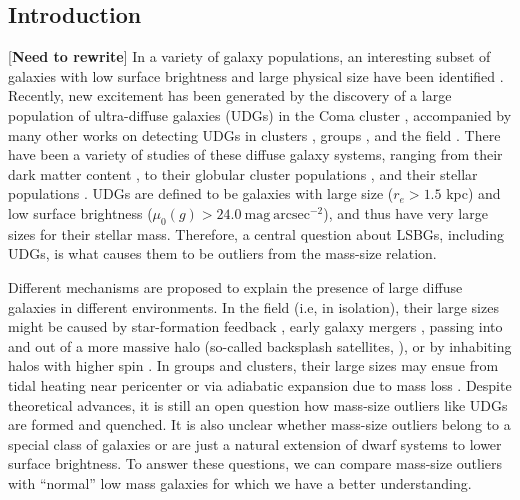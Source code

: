 \documentclass[twocolumn,astrosymb,twocolappendix]{aastex631}
\newcommand{\sbunit}{\mathrm{mag\ arcsec}^{-2}}
\newcommand{\sbcen}{\mu_{0}(g)}
\begin{document}
\begin{CJK*}{UTF8}{gbsn}


\section{Introduction} \label{sec:intro}
[\textbf{Need to rewrite}] In a variety of galaxy populations, an interesting subset of galaxies with low surface brightness and large physical size have been identified \citep[dubbed low surface brightness galaxies or LSBGs, e.g.,][]{Sandage1984,Caldwell1987,Impey1988,McGaugh1995,Dalcanton1997a}. Recently, new excitement has been generated by the discovery of a large population of ultra-diffuse galaxies (UDGs) in the Coma cluster \citep{vanDokkum2015}, accompanied by many other works on detecting UDGs in clusters \citep[e.g.,][]{Koda2015,Mihos2015,Yagi2016,vdBurg2016,vdBurg2017,Lee2017,ManceraPina2018,Zaritsky2019}, groups \citep[e.g.,][]{Roman2017b,Greco2018,SAGA-II,CarlstenELVES2022}, and the field \citep[e.g.,][]{Leisman2017,Roman2019,Prole2019,Tanoglidis2021,Kadowaki2021}. There have been a variety of studies of these diffuse galaxy systems, ranging from their dark matter content \citep[e.g.,][]{Mowla2017,vanDokkum2018,vanDokkum2019,Wasserman2019,Keim2022}, to their globular cluster populations \citep[e.g.,][]{vanDokkum2017,Somalwar2020,Forbes2020,Danieli2022,Gannon2022}, and their stellar populations \citep[e.g.,][]{Gu2018,Ferre-Mateu2018,Villaume2022}. UDGs are defined to be galaxies with large size ($r_e > 1.5$ kpc) and low surface brightness ($\sbcen > 24.0\ \sbunit$), and thus have very large sizes for their stellar mass. Therefore, a central question about LSBGs, including UDGs, is what causes them to be outliers from the mass-size relation.  

Different mechanisms are proposed to explain the presence of large diffuse galaxies in different environments. In the field (i.e, in isolation), their large sizes might be caused by star-formation feedback \citep{DiCintio2017,Chan2018}, early galaxy mergers \citep{Wright2021}, passing into and out of a more massive halo (so-called backsplash satellites, \citealt{Benavides2021}), or by inhabiting halos with higher spin \citep{Dalcanton1997,Amorisco2016,Liao2019,Benavides2022}. In groups and clusters, their large sizes may ensue from tidal heating near pericenter \citep{Jiang2019} or via adiabatic expansion due to mass loss \citep{Tremmel2020}. Despite theoretical advances, it is still an open question how mass-size outliers like UDGs are formed and quenched. It is also unclear whether mass-size outliers belong to a special class of galaxies or are just a natural extension of dwarf systems to lower surface brightness. To answer these questions, we can compare mass-size outliers with ``normal'' low mass galaxies for which we have a better understanding. 


\end{CJK*}
\end{document}
